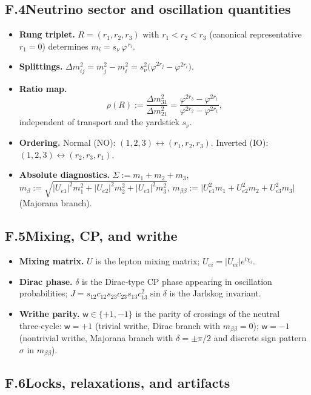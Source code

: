 \documentclass[11pt]{article}
\begin{document}
\subsection*{F.4\quad Neutrino sector and oscillation quantities}

\begin{itemize}
  \item \textbf{Rung triplet.} $R=(r_1,r_2,r_3)$ with $r_1<r_2<r_3$ (canonical representative $r_1=0$) determines $m_i=s_\nu\,\varphi^{\,r_i}$.
  \item \textbf{Splittings.} $\Delta m^2_{ij}=m_j^2-m_i^2=s_\nu^2\big(\varphi^{2r_j}-\varphi^{2r_i}\big)$.
  \item \textbf{Ratio map.}
  \[
  \rho(R):=\frac{\Delta m^2_{31}}{\Delta m^2_{21}}
  =\frac{\varphi^{2r_3}-\varphi^{2r_1}}{\varphi^{2r_2}-\varphi^{2r_1}},
  \]
  independent of transport and the yardstick $s_\nu$.
  \item \textbf{Ordering.} Normal (NO): $(1,2,3)\leftrightarrow(r_1,r_2,r_3)$. Inverted (IO): $(1,2,3)\leftrightarrow(r_2,r_3,r_1)$.
  \item \textbf{Absolute diagnostics.} $\Sigma:=m_1+m_2+m_3$, $m_\beta:=\sqrt{|U_{e1}|^2 m_1^2+|U_{e2}|^2 m_2^2+|U_{e3}|^2 m_3^2}$, $m_{\beta\beta}:=\big|U_{e1}^2m_1+U_{e2}^2m_2+U_{e3}^2m_3\big|$ (Majorana branch).
\end{itemize}

\subsection*{F.5\quad Mixing, CP, and writhe}

\begin{itemize}
  \item \textbf{Mixing matrix.} $U$ is the lepton mixing matrix; $U_{ei}=|U_{ei}|e^{i\chi_i}$.
  \item \textbf{Dirac phase.} $\delta$ is the Dirac‑type CP phase appearing in oscillation probabilities; $J=s_{12}c_{12}s_{23}c_{23}s_{13}c_{13}^2\sin\delta$ is the Jarlskog invariant.
  \item \textbf{Writhe parity.} $\mathsf{w}\in\{+1,-1\}$ is the parity of crossings of the neutral three‑cycle: $\mathsf{w}=+1$ (trivial writhe, Dirac branch with $m_{\beta\beta}=0$); $\mathsf{w}=-1$ (nontrivial writhe, Majorana branch with $\delta=\pm\pi/2$ and discrete sign pattern $\sigma$ in $m_{\beta\beta}$).
\end{itemize}

\subsection*{F.6\quad Locks, relaxations, and artifacts}
\end{document}
